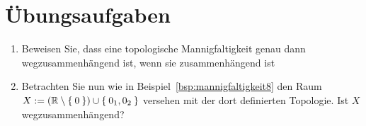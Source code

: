 \clearpage
\section*{Übungsaufgaben}

\begin{aufgabe}\label{ub3:aufg1}
\end{aufgabe}

\begin{aufgabe}[Zusammenhang]\label{ub4:aufg1}
    \begin{enumerate}[label=(\alph*)]
        \item Beweisen Sie, dass eine topologische Mannigfaltigkeit
              genau dann wegzusammenhängend ist, wenn sie zusammenhängend
              ist
        \item Betrachten Sie nun wie in Beispiel~\ref{bsp:mannigfaltigkeit8}
              den Raum $X:= (\mathbb{R} \setminus \Set{0}) \cup \Set{0_1, 0_2}$
              versehen mit der dort definierten Topologie. Ist $X$
              wegzusammenhängend?
    \end{enumerate}
\end{aufgabe}
